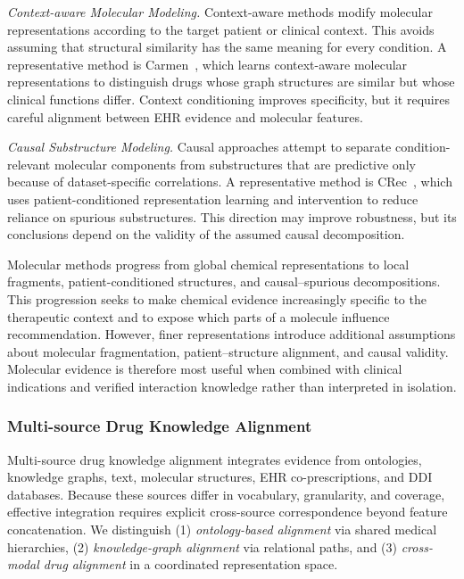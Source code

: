 \documentclass[manuscript,review]{acmart}
\begin{document}
\textit{Context-aware Molecular Modeling.} Context-aware methods modify molecular representations according to the target patient or clinical context. This avoids assuming that structural similarity has the same meaning for every condition. A representative method is Carmen~\cite{chen2023carmen}, which learns context-aware molecular representations to distinguish drugs whose graph structures are similar but whose clinical functions differ. Context conditioning improves specificity, but it requires careful alignment between EHR evidence and molecular features.

\textit{Causal Substructure Modeling.} Causal approaches attempt to separate condition-relevant molecular components from substructures that are predictive only because of dataset-specific correlations. A representative method is CRec~\cite{zhangRevisitingDrugRecommendation2025c}, which uses patient-conditioned representation learning and intervention to reduce reliance on spurious substructures. This direction may improve robustness, but its conclusions depend on the validity of the assumed causal decomposition.

Molecular methods progress from global chemical representations to local fragments, patient-conditioned structures, and causal--spurious decompositions. This progression seeks to make chemical evidence increasingly specific to the therapeutic context and to expose which parts of a molecule influence recommendation. However, finer representations introduce additional assumptions about molecular fragmentation, patient--structure alignment, and causal validity. Molecular evidence is therefore most useful when combined with clinical indications and verified interaction knowledge rather than interpreted in isolation.

\subsubsection{Multi-source Drug Knowledge Alignment}

Multi-source drug knowledge alignment integrates evidence from ontologies, knowledge graphs, text, molecular structures, EHR co-prescriptions, and DDI databases. Because these sources differ in vocabulary, granularity, and coverage, effective integration requires explicit cross-source correspondence beyond feature concatenation. We distinguish (1) \textit{ontology-based alignment} via shared medical hierarchies, (2) \textit{knowledge-graph alignment} via relational paths, and (3) \textit{cross-modal drug alignment} in a coordinated representation space.
\end{document}
